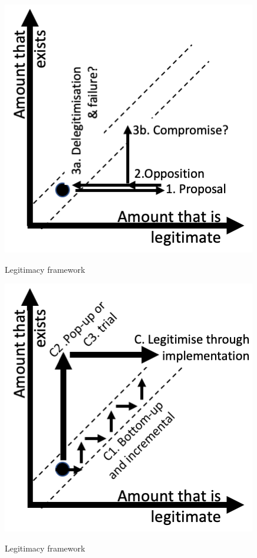 \documentclass{tufte-handout}
\begin{document}
\begin{marginfigure}%
  \includegraphics[width=\linewidth]{Figure3}
  \caption{Legitimacy framework}
  \label{fig:FIgure3}
\end{marginfigure}


\begin{marginfigure}%
  \includegraphics[width=\linewidth]{Figure4}
  \caption{Legitimacy framework}
  \label{fig:FIgure4}
\end{marginfigure}
\end{document}
